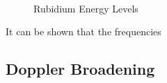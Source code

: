 \documentclass[12pt]{article}
\begin{document}
\begin{figure}%
	\centering
	\,
	\caption{Rubidium Energy Levels}%
	\label{fig:RbEnergy}%
\end{figure}

It can be shown that the frequencies

\subsection*{Doppler Broadening}
\end{document}
